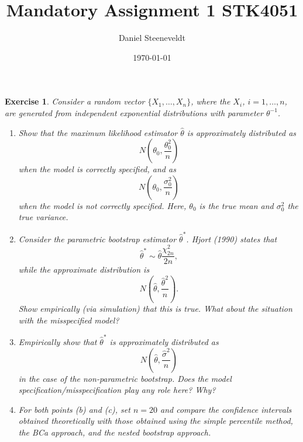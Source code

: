 \documentclass[a4paper,12pt]{article}
\title{Mandatory Assignment 1 STK4051}
\author{Daniel Steeneveldt}
\date{\today}
\theoremstyle{breaktheorem}
\theoremstyle{exerciseStyle}
\newtheorem{exercise}{Exercise}[section]
\theoremstyle{solutionStyle}
\begin{document}
\maketitle

\begin{exercise}{1}
    Consider a random vector $\{X_1, \ldots, X_n\}$, where the $X_i$, $i=1, \ldots, n$, are generated from independent exponential distributions with parameter $\theta^{-1}$.

    \begin{enumerate}
        \item[(a)] Show that the maximum likelihood estimator $\hat{\theta}$ is approximately distributed as
              \[
                  N\left(\theta_0, \frac{\theta_0^2}{n}\right)
              \]
              when the model is correctly specified, and as
              \[
                  N\left(\theta_0, \frac{\sigma_0^2}{n}\right)
              \]
              when the model is not correctly specified. Here, $\theta_0$ is the true mean and $\sigma_0^2$ the true variance.

        \item[(b)] Consider the parametric bootstrap estimator $\hat{\theta}^*$. Hjort (1990) states that
              \[
                  \hat{\theta}^* \sim \hat{\theta}\frac{\chi^2_{2n}}{2n},
              \]
              while the approximate distribution is
              \[
                  N\left(\hat{\theta}, \frac{\hat{\theta}^2}{n}\right).
              \]
              Show empirically (via simulation) that this is true. What about the situation with the misspecified model?

        \item[(c)] Empirically show that $\hat{\theta}^*$ is approximately distributed as
              \[
                  N\left(\hat{\theta}, \frac{\hat{\sigma}^2}{n}\right)
              \]
              in the case of the non-parametric bootstrap. Does the model specification/misspecification play any role here? Why?

        \item[(d)] For both points (b) and (c), set $n = 20$ and compare the confidence intervals obtained theoretically with those obtained using the simple percentile method, the BCa approach, and the nested bootstrap approach.
    \end{enumerate}
\end{exercise}
\end{document}
